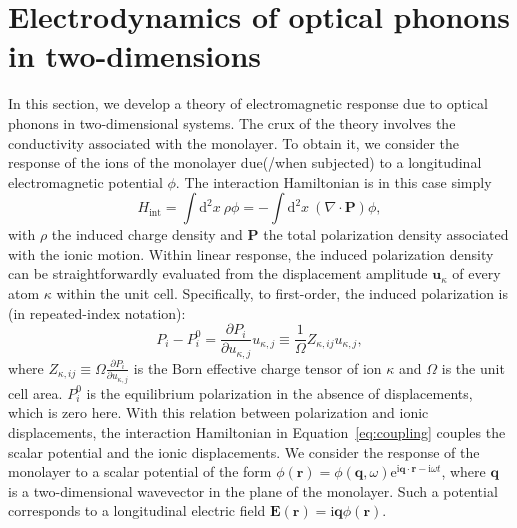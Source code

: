 \documentclass[aps,prb,twocolumn,
	           groupedaddress,superscriptaddress,
               amsfonts,amssymb,amsmath,floatfix,
	           citeautoscript]{revtex4-1}
\newcommand{\iu}{\mathrm{i}}
\newcommand{\e}{\mathrm{e}}
\newcommand{\dd}{\mathrm{d}}
\newcommand{\comment}[2]{%
    \ifbool{togglecomments}%
    {\textcolor{blue!70!black}{\small\textsf{%
    \textsuperscript{\textsc{\textsf{\MakeLowercase{#1}}}}%
    [#2]}}} %
    {}}     %
\begin{document}
\section{Electrodynamics of optical phonons in two-dimensions}


In this section, we develop a theory of electromagnetic response due to optical phonons in two-dimensional systems. The crux of the theory involves the conductivity associated with the monolayer. To obtain it, we consider the response of the ions of the monolayer due(/when subjected) to a longitudinal electromagnetic potential $\phi$. The interaction Hamiltonian is in this case simply
\begin{equation}
    H_{\mathrm{int}} = \int \dd^2x ~\rho \phi = -\int \dd^2x~ (\nabla\cdot\mathbf{P})\phi,
    \label{eq:coupling}
\end{equation} 
with $\rho$ the induced charge density and $\mathbf{P}$ the total polarization density associated with the ionic motion. 
Within linear response, the induced polarization density can be straightforwardly evaluated from the displacement amplitude $\mathbf{u}_{\kappa}$ of every atom $\kappa$ within the unit cell. Specifically, to first-order, the induced polarization is (in repeated-index notation):
\begin{equation}
    P_i - P_i^{0} = \frac{\partial P_i}{\partial u_{\kappa,j}}u_{\kappa,j} \equiv \frac{1}{\Omega}Z_{\kappa,ij}u_{\kappa,j},
\end{equation} 
where $Z_{\kappa,ij} \equiv \Omega\frac{\partial P_i}{\partial u_{\kappa,j}} $ is the Born effective charge tensor of ion $\kappa$ and $\Omega$ is the unit cell area. $P_i^{0}$ is the equilibrium polarization in the absence of displacements, which is zero here. With this relation between polarization and ionic displacements, the interaction Hamiltonian in Equation~\eqref{eq:coupling} couples the scalar potential and the ionic displacements.  We consider the response of the monolayer to a scalar potential of the form $\phi(\mathbf{r}) = \phi(\mathbf{q},\omega)\e^{\iu\mathbf{q}\cdot\mathbf{r}-\iu\omega t}$, where $\mathbf{q}$ is a two-dimensional wavevector in the plane of the monolayer. Such a potential corresponds to a longitudinal electric field  $\mathbf{E}(\mathbf{r}) = \iu\mathbf{q}\phi(\mathbf{r})$. 
\end{document}
